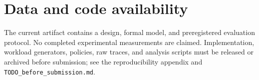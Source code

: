 \documentclass[preprint,12pt,authoryear]{elsarticle}
\theoremstyle{remark}
\begin{document}
\section*{Data and code availability}
The current artifact contains a design, formal model, and preregistered evaluation protocol. No completed experimental measurements are claimed. Implementation, workload generators, policies, raw traces, and analysis scripts must be released or archived before submission; see the reproducibility appendix and \texttt{TODO\_before\_submission.md}.



\end{document}
